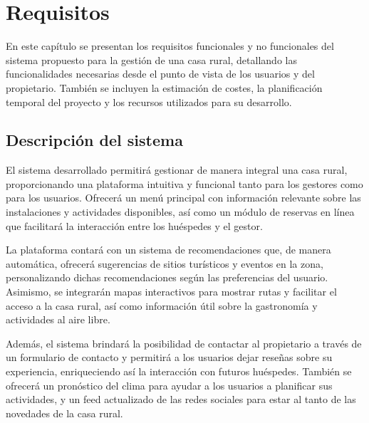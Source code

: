 
\section{Requisitos}
En este capítulo se presentan los requisitos funcionales y no funcionales del sistema propuesto para la gestión de una casa rural, detallando las funcionalidades necesarias desde el punto de vista de los usuarios y del propietario. También se incluyen la estimación de costes, la planificación temporal del proyecto y los recursos utilizados para su desarrollo.
\subsection{Descripción del sistema}

El sistema desarrollado permitirá gestionar de manera integral una casa rural, proporcionando una plataforma intuitiva y funcional tanto para los gestores como para los usuarios. Ofrecerá un menú principal con información relevante sobre las instalaciones y actividades disponibles, así como un módulo de reservas en línea que facilitará la interacción entre los huéspedes y el gestor.

La plataforma contará con un sistema de recomendaciones que, de manera automática, ofrecerá sugerencias de sitios turísticos y eventos en la zona, personalizando dichas recomendaciones según las preferencias del usuario. Asimismo, se integrarán mapas interactivos para mostrar rutas y facilitar el acceso a la casa rural, así como información útil sobre la gastronomía y actividades al aire libre.

Además, el sistema brindará la posibilidad de contactar al propietario a través de un formulario de contacto y permitirá a los usuarios dejar reseñas sobre su experiencia, enriqueciendo así la interacción con futuros huéspedes. También se ofrecerá un pronóstico del clima para ayudar a los usuarios a planificar sus actividades, y un feed actualizado de las redes sociales para estar al tanto de las novedades de la casa rural.


